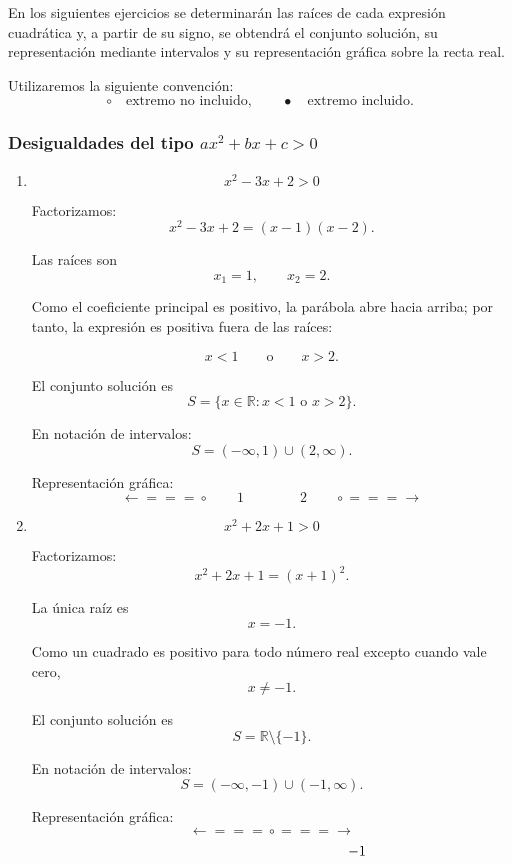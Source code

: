 \documentclass[12pt]{article}
\begin{document}
{En los siguientes ejercicios se determinarán las raíces de cada expresión
cuadrática y, a partir de su signo, se obtendrá el conjunto solución,
su representación mediante intervalos y su representación gráfica sobre
la recta real.

Utilizaremos la siguiente convención:
\[
\circ \quad \text{extremo no incluido},
\qquad
\bullet \quad \text{extremo incluido}.
\]

\subsubsection*{Desigualdades del tipo \(ax^2+bx+c>0\)}

\begin{enumerate}

\item
\[
x^2-3x+2>0
\]

Factorizamos:
\[
x^2-3x+2=(x-1)(x-2).
\]

Las raíces son
\[
x_1=1,
\qquad
x_2=2.
\]

Como el coeficiente principal es positivo, la parábola abre hacia arriba;
por tanto, la expresión es positiva fuera de las raíces:

\[
x<1
\qquad \text{o} \qquad
x>2.
\]

El conjunto solución es
\[
\boxed{
S=\{x\in\mathbb{R}:x<1\text{ o }x>2\}.
}
\]

En notación de intervalos:
\[
\boxed{
S=(-\infty,1)\cup(2,\infty).
}
\]

Representación gráfica:
\[
\longleftarrow\!\!=\!\!=\!\!=\!\circ
\qquad 1
\qquad\qquad
2\qquad
\circ\!\!=\!\!=\!\!=\!\longrightarrow
\]

\item
\[
x^2+2x+1>0
\]

Factorizamos:
\[
x^2+2x+1=(x+1)^2.
\]

La única raíz es
\[
x=-1.
\]

Como un cuadrado es positivo para todo número real excepto cuando vale
cero,
\[
x\neq -1.
\]

El conjunto solución es
\[
\boxed{
S=\mathbb{R}\setminus\{-1\}.
}
\]

En notación de intervalos:
\[
\boxed{
S=(-\infty,-1)\cup(-1,\infty).
}
\]

Representación gráfica:
\[
\longleftarrow\!\!=\!\!=\!\!=\!\circ\!\!=\!\!=\!\!=\!\longrightarrow
\]
\[
\hspace{4.3cm}-1
\]


\end{enumerate}}
\end{document}

